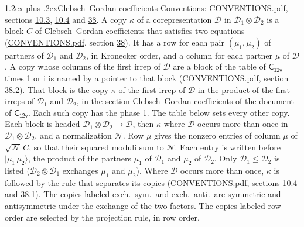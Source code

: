 \documentclass[10pt,a4paper]{article}
\makeatletter
\renewcommand\section{\@startsection{section}{1}{\z@}{-3ex plus -1ex minus -.2ex}%
  {1.2ex plus .2ex}{\normalfont\large\sffamily\bfseries\color{parttitle}}}
\numberwithin{equation}{section}
\newcommand{\grp}[1]{\mathsf{#1}}
\newcommand{\iunit}{\mathrm{i}}
\newcommand{\irrprod}{\otimes}
\newcommand{\mult}{\kappa}
\newcommand{\intx}{\mu}
\newcommand{\cgnorm}{\mathcal{N}}
\newcommand{\prodket}[2]{\lvert {#1}\,{#2}\rangle}
\makeatother
\begin{document}
\section{Clebsch--Gordan coefficients}\label{s:clebsch_gordan}
Conventions: \href{../../CONVENTIONS.pdf}{CONVENTIONS.pdf}, sections \href{../../../rotation/CONVENTIONS.pdf\#conv.10.3}{10.3}, \href{../../../rotation/CONVENTIONS.pdf\#conv.10.4}{10.4} and \href{../../CONVENTIONS.pdf\#conv.38}{38}.
\leavevmode\label{n:index.copy}\label{n:matrix.cg.stored}A copy $\mult$ of a corepresentation $\mathcal{D}$ in $\mathcal{D}_1\irrprod\mathcal{D}_2$ is a block $C$ of Clebsch--Gordan coefficients that satisfies two equations (\href{../../CONVENTIONS.pdf}{CONVENTIONS.pdf}, section \href{../../CONVENTIONS.pdf\#conv.38}{38}). \label{n:index.cg}It has a row for each pair $(\intx_1, \intx_2)$ of partners of $\mathcal{D}_1$ and $\mathcal{D}_2$, in Kronecker order, and a column for each partner $\intx$ of $\mathcal{D}$.
A copy whose columns of the first irrep of $\mathcal{D}$ are a block of the table of $\grp{C_{12v}}$ times 1 or $\iunit$ is named by a pointer to that block (\href{../../CONVENTIONS.pdf}{CONVENTIONS.pdf}, section \href{../../CONVENTIONS.pdf\#conv.38.2}{38.2}). That block is the copy $\mult$ of the first irrep of $\mathcal{D}$ in the product of the first irreps of $\mathcal{D}_1$ and $\mathcal{D}_2$, in the section Clebsch--Gordan coefficients of the document of \href{../../../rotation/data/pdf/C12v.pdf}{$\grp{C_{12v}}$}. Each such copy has the phase 1. The table below sets every other copy.
Each block is headed $\mathcal{D}_1\irrprod\mathcal{D}_2\to\mathcal{D}$, then $\mult$ where $\mathcal{D}$ occurs more than once in $\mathcal{D}_1\irrprod\mathcal{D}_2$, and a normalization $\cgnorm$. Row $\intx$ gives the nonzero entries of column $\intx$ of $\sqrt{\cgnorm}\,C$, so that their squared moduli sum to $\cgnorm$. \label{n:vector.ket.product}Each entry is written before $\prodket{\intx_1}{\intx_2}$, the product of the partners $\intx_1$ of $\mathcal{D}_1$ and $\intx_2$ of $\mathcal{D}_2$. Only $\mathcal{D}_1 \le \mathcal{D}_2$ is listed ($\mathcal{D}_2\irrprod\mathcal{D}_1$ exchanges $\intx_1$ and $\intx_2$).
Where $\mathcal{D}$ occurs more than once, $\mult$ is followed by the rule that separates its copies (\href{../../CONVENTIONS.pdf}{CONVENTIONS.pdf}, sections \href{../../../rotation/CONVENTIONS.pdf\#conv.10.4}{10.4} and \href{../../CONVENTIONS.pdf\#conv.38.1}{38.1}). \label{n:abbreviation.exchange}The copies labeled exch.\ sym.\ and exch.\ anti.\ are symmetric and antisymmetric under the exchange of the two factors. The copies labeled row order are selected by the projection rule, in row order.
\end{document}
